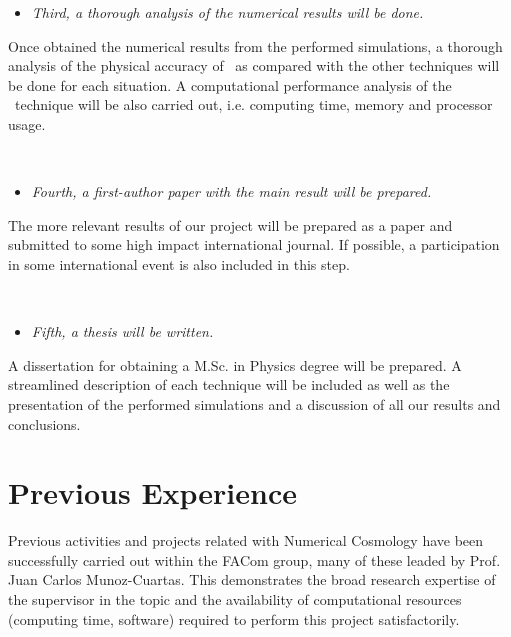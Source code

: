 \documentclass[a4,useAMS,usenatbib,usegraphicx,12pt]{article}
\begin{document}
\begin{itemize}
\item[\checkmark] \textit{Third, a thorough analysis of the numerical results 
will be done.}
\end{itemize}


Once obtained the numerical results from the performed simulations, a thorough
analysis of the physical accuracy of \VPH\ as compared with the other techniques
will be done for each situation. A computational performance analysis of the 
\VPH\ technique will be also carried out, i.e. computing time, memory and 
processor usage.

\

\begin{itemize}
\item[\checkmark] \textit{Fourth, a first-author paper with the main result will
be prepared.}
\end{itemize}


The more relevant results of our project will be prepared as a paper and 
submitted to some high impact international journal. If possible, a participation
in some international event is also included in this step.

\

\begin{itemize}
\item[\checkmark] \textit{Fifth, a thesis will be written.}
\end{itemize}


A dissertation for obtaining a M.Sc. in Physics degree will be prepared. A
streamlined description of each technique will be included as well as the 
presentation of the performed simulations and a discussion of all our results
and conclusions.


\section{Previous Experience}
Previous activities and projects related with Numerical Cosmology have been 
successfully carried out within the FACom group, many of these leaded by Prof. 
Juan Carlos Munoz-Cuartas. This demonstrates the broad research expertise of 
the supervisor in the topic and the availability of computational resources 
(computing time, software) required to perform this project satisfactorily.
\end{document}
